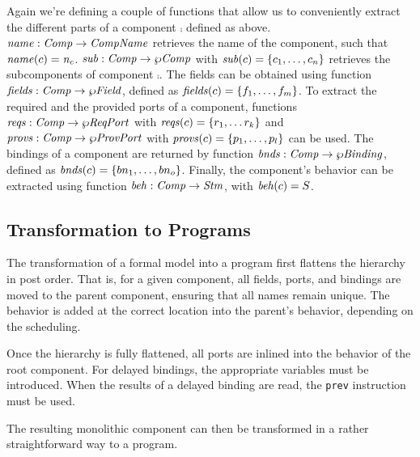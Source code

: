 \documentclass[a4paper,10pt,english]{article}
\begin{document}
Again we're defining a couple of functions that allow us to conveniently extract the different parts of a component $\comp$
defined as above. $\mathit{name} : \mathit{Comp} \rightarrow \mathit{CompName}$ retrieves the name of the component, such that
$\mathit{name}(c) = \mathit{n_c}$. $\mathit{sub} : \mathit{Comp} \rightarrow \wp \mathit{Comp}$ with $\mathit{sub}(c) = \{c_1, \ldots, c_n\}$
retrieves the subcomponents of component $\comp$. The fields can be obtained using function $\mathit{fields} : \mathit{Comp} \rightarrow
\wp \mathit{Field}$, defined as $\mathit{fields}(c) = \{ f_1, \ldots, f_m \}$. To extract the required and the provided ports
of a component, functions $\mathit{reqs} : \mathit{Comp} \rightarrow \wp \mathit{ReqPort}$ with $\mathit{reqs}(c) = \{ r_1, \ldots r_k \}$
and $\mathit{provs} : \mathit{Comp} \rightarrow \wp \mathit{ProvPort}$ with $\mathit{provs}(c) = \{ p_1, \ldots, p_l \}$ can be used. The
bindings of a component are returned by function $\mathit{bnds} : \mathit{Comp} \rightarrow \wp \mathit{Binding}$, defined as $\mathit{bnds}(c) =
\{ bn_1, \ldots, bn_o \}$. Finally, the component's behavior can be extracted using function $\mathit{beh} : \mathit{Comp}
\rightarrow \mathit{Stm}$, with $\mathit{beh}(c) = S$.

\subsection{Transformation to \Fil Programs}
The transformation of a formal model into a \Fil program first flattens the hierarchy in post order. That is, for a given
component, all fields, ports, and bindings are moved to the parent component, ensuring that all names remain unique. The behavior
is added at the correct location into the parent's behavior, depending on the scheduling. 

Once the hierarchy is fully flattened, all ports are inlined into the behavior of the root component. For delayed bindings, the
appropriate variables must be introduced. When the results of a delayed binding are read, the \texttt{prev} instruction must be used.

The resulting monolithic component can then be transformed in a rather straightforward way to a \Fil program.
\end{document}
